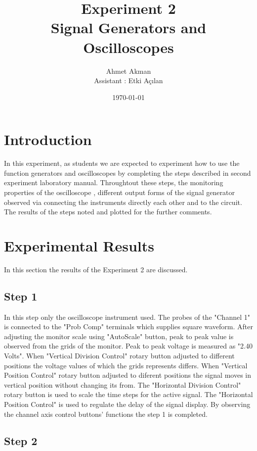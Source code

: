 \documentclass[letterpaper,12pt]{article}
\begin{document}
\title{Experiment 2 \protect\\Signal Generators and Oscilloscopes}
\author{Ahmet Akman \protect\\ Assistant : Etki Açılan}
\date{\today}
\maketitle



\section{Introduction} 
In this experiment, as students we are expected to experiment how to use the function generators and oscilloscopes by completing the steps described in second experiment laboratory manual. Throughtout these steps, the monitoring properties of the oscilloscope , different output forms of the signal generator observed via connecting the instruments directly each other and to the circuit. The results of the steps noted and plotted for the further comments.
\section{Experimental Results}
In this section the results of the Experiment 2 are discussed.
\subsection{Step 1}
In this step only the oscilloscope instrument used. The probes of the "Channel 1" is connected to the "Prob Comp" terminals which supplies square waveform. After adjusting the monitor scale using "AutoScale" button, peak to peak value is observed from the grids of the monitor. Peak to peak voltage is measured as "2.40 Volts". When "Vertical Division Control" rotary button adjusted to different positions the voltage values of which the grids represents differs. When "Vertical Position Control" rotary button adjusted to diferent positions the signal moves in vertical position without changing its from. The "Horizontal Division Control" rotary button is used to scale the time steps for the active signal. The "Horizontal Position Control" is used to regulate the delay of the signal display. By observing the channel axis control buttons' functions the step 1 is completed.
\subsection{Step 2}
\end{document}
